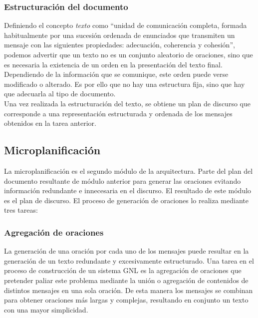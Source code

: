 \subsubsection{Estructuración del documento}
Definiendo el concepto \textit{texto} como ``unidad de comunicación completa, formada habitualmente por una sucesión ordenada de enunciados que transmiten un mensaje con las siguientes propiedades: adecuación, coherencia y cohesión'', podemos advertir que un texto no es un conjunto aleatorio de oraciones, sino que es necesaria la existencia de un orden en la presentación del texto final.\\

Dependiendo de la información que se comunique, este orden puede verse modificado o alterado. Es por ello que no hay una estructura fija, sino que hay que adecuarla al tipo de documento.\\

Una vez realizada la estructuración del texto, se obtiene un plan de discurso que corresponde a una representación estructurada y ordenada de los mensajes obtenidos en la tarea anterior.\\

\subsection{Microplanificación}
La microplanificación es el segundo módulo de la arquitectura. Parte del plan del documento resultante de módulo anterior para generar las oraciones evitando información redundante e innecesaria en el discurso. El resultado de este módulo es el plan de discurso. El proceso de generación de oraciones lo realiza mediante tres tareas:\\

\subsubsection{Agregación de oraciones}
La generación de una oración por cada uno de los mensajes puede resultar en la generación de un texto redundante y excesivamente estructurado. Una tarea en el proceso de construcción de un sistema GNL es la agregación de oraciones que pretender paliar este problema mediante la unión o agregación de contenidos de distintos mensajes en una sola oración. De esta manera los mensajes se combinan para obtener oraciones más largas y complejas, resultando en conjunto un texto con una mayor simplicidad.\\

